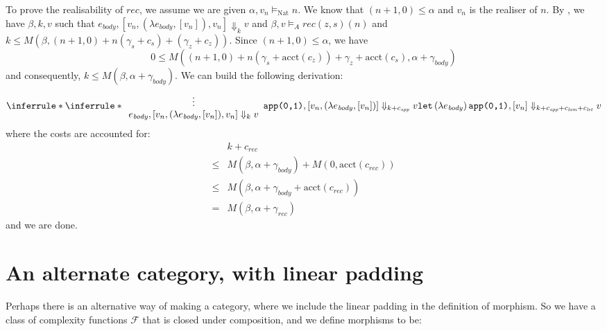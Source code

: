 \documentclass{workingnote}
\newcommand{\account}{\mathrm{acct}}
\newcommand{\TyNat}{\mathrm{Nat}}
\begin{document}
To prove the realisability of $\mathit{rec}$, we assume we are given
$\alpha, v_n \models_\TyNat n$. We know that $(n+1, 0) \leq \alpha$
and $v_n$ is the realiser of $n$. By , we
have $\beta, k, v$ such that
$e_{\mathit{body}}, [v_n, (\lambda e_{\mathit{body}}, [v_n]), v_n]
\Downarrow_k v$ and $\beta, v \models_A \mathit{rec}(z,s)(n)$ and
$k \leq M(\beta, (n+1,0) + n(\gamma_s + c_s) + (\gamma_z +
c_z))$. Since $(n+1,0) \leq \alpha$, we have
\begin{displaymath}
  0 \leq M((n+1,0) + n(\gamma_s + \account(c_z)) + \gamma_z + \account(c_s), \alpha + \gamma_{\mathit{body}})
\end{displaymath}
and consequently, $k \leq M(\beta, \alpha +
\gamma_{\mathit{body}})$. We can build the following derivation:
\begin{displaymath}
  \inferrule*
  {\inferrule*
    { {\begin{array}{c} \vdots \\ e_{\mathit{body}}, [v_n, (\lambda e_{\mathit{body}}, [v_n]), v_n] \Downarrow_k v \end{array}}}
    {\Apply{\Idx{0}}{\Idx{1}}, [v_n, (\lambda e_{\mathit{body}}, [v_n])] \Downarrow_{k+\cnstApp} v}}
  {\Let\,(\lambda e_{\mathit{body}})\,\Apply{\Idx{0}}{\Idx{1}}, [v_n] \Downarrow_{k+\cnstApp+\cnstLam+\cnstLet} v}
\end{displaymath}
where the costs are accounted for:
\begin{displaymath}
  \begin{array}{cl}
    &k + c_{\mathit{rec}} \\
    \leq&M(\beta, \alpha+\gamma_{\mathit{body}}) + M(0,\account(c_{\mathit{rec}})) \\
    \leq&M(\beta, \alpha+\gamma_{\mathit{body}}+\account(c_{\mathit{rec}})) \\
    =   &M(\beta, \alpha+\gamma_{\mathit{rec}})
  \end{array}
\end{displaymath}
and we are done.

\section{An alternate category, with linear padding}

Perhaps there is an alternative way of making a category, where we
include the linear padding in the definition of morphism. So we have a
class of complexity functions $\mathcal{F}$ that is closed under
composition, and we define morphisms to be:
\end{document}
